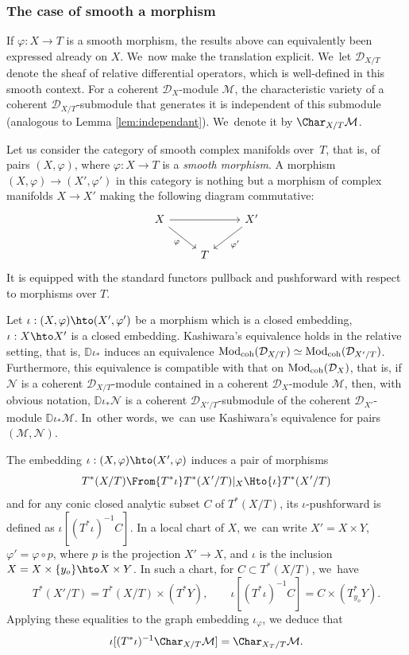 \documentclass{amsart}
\theoremstyle{plain}
\numberwithin{theorem}{section}
\theoremstyle{definition}
\theoremstyle{remark}
\theoremstyle{definition}
\newcommand{\D}{\mathbb{D}}
\newcommand{\cD}{\mathcal{D}}
\newcommand{\cM}{\mathcal{M}}
\newcommand{\cN}{\mathcal{N}}
\newcommand{\Mod}{\textup{Mod}}
\newcommand{\coh}{\textup{coh}}
\begin{document}
\subsubsection*{The case of smooth a morphism}
If $\varphi:X\to T$ is a smooth morphism, the results above can equivalently been expressed already on $X$. We~now make the translation explicit. We~let $\cD_{X/T}$ denote the sheaf of relative differential operators, which is well-defined in this smooth context. For a coherent $\cD_X$-module $\cM$, the characteristic variety of a coherent $\cD_{X/T}$-submodule that generates it is independent of this submodule (analogous to Lemma \ref{lem:independant}). We~denote it by $\Char_{X/T}\cM$. 

Let us consider the category of smooth complex manifolds over~$T$, that is, of pairs $(X,\varphi)$, where $\varphi:X\to T$ is a \emph{smooth morphism}. A morphism $(X,\varphi)\to(X',\varphi')$ in this category is nothing but a morphism of complex manifolds $X\to X'$ making the following diagram commutative:
\[
\begin{tikzcd}
X \arrow[dr, "\varphi" swap] \arrow[rr] && X'\arrow[dl, "\varphi'"] \\
& T
\end{tikzcd}
\]
It is equipped with the standard functors pullback and pushforward with respect to morphisms over $T$.

Let $\iota:(X,\varphi)\hto(X',\varphi')$ be a morphism which is a closed embedding, \ie \hbox{$\iota:X\hto X'$} is a closed embedding. Kashiwara's equivalence holds in the relative setting, that is, $\D\iota_*$ induces an equivalence $\Mod_\coh(\cD_{X/T})\simeq\Mod_\coh(\cD_{X'/T})$. Furthermore, this equivalence is compatible with that on $\Mod_\coh(\cD_X)$, that is, if $\cN$ is a coherent $\cD_{X/T}$-module contained in a coherent $\cD_X$-module $\cM$, then, with obvious notation, $\D\iota_*\cN$ is a coherent $\cD_{X'/T}$-submodule of the coherent $\cD_{X'}$-module $\D\iota_*\cM$. In~other words, we~can use Kashiwara's equivalence for pairs $(\cM,\cN)$.

The embedding $\iota:(X,\varphi)\hto(X',\varphi)$ induces a pair of morphisms
\[
T^*(X/T)\From{T^*\iota}T^*(X'/T)|_X\Hto{\iota}T^*(X'/T)
\]
and for any conic closed analytic subset $C$ of $T^*(X/T)$, its $\iota$-pushforward is defined as $\iota[(T^*\iota)^{-1}C]$. In a local chart of $X$, we~can write $X'=X\times Y$, $\varphi'=\varphi\circ p$, where $p$ is the projection $X'\to X$, and $\iota$ is the inclusion $X=X\times\{y_o\}\hto X\times Y$. In such a chart, for $C\subset T^*(X/T)$, we~have
\[
T^*(X'/T)=T^*(X/T)\times (T^*Y),\qquad \iota[(T^*\iota)^{-1}C]=C\times (T^*_{y_o}Y).
\]
Applying these equalities to the graph embedding $\iota_\varphi$, we deduce that
\[
\iota[(T^*\iota)^{-1}\Char_{X/T}\cM]=\Char_{X_T/T}\cM.
\]
\end{document}
